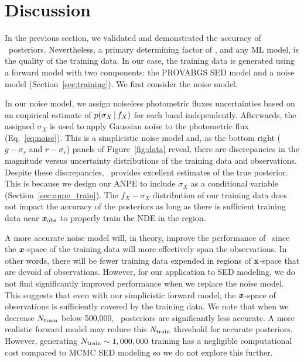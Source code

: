\section{Discussion} \label{sec:discuss}
In the previous section, we validated and demonstrated the accuracy of
\sedflow~posteriors. 
Nevertheless, a primary determining factor of \sedflow, and any ML model, is
the quality of the training data.
In our case, the training data is generated using a forward model with two
components: the PROVABGS SED model and a noise model
(Section~\ref{sec:training}).
We first consider the noise model. 

In our noise model, we assign noiseless photometric fluxes uncertainties based
on an empirical estimate of $p(\sigma_X\,|\, f_X)$ for each band
independently. 
Afterwards, the assigned $\sigma_X$ is used to apply Gaussian noise to the
photometric flux (Eq.~\ref{eq:noise}). 
This is a simplicistic noise model and, as the bottom right ($g - \sigma_r$ and
$r - \sigma_r$) panels of Figure~\ref{fig:data} reveal, there are discrepancies
in the magnitude versus uncertainty distributions of the training data and
observations. 
Despite these discrepancies, \sedflow~provides excellent estimates of the true
posterior.  
This is because we design our ANPE to include $\sigma_X$ as a conditional
variable (Section~\ref{sec:anpe_train}).
The $f_X-\sigma_X$ distribution of our training data does not impact the
accuracy of the posteriors as long as there is sufficient training data near
$\textbf{\textit{x}}_{\rm obs}$ to properly train the NDE in the region.

A more accurate noise model will, in theory, improve the performance of
\sedflow~since the $\textbf{\textit{x}}$-space of the training data will more effectively
span the observations. 
In other words, there will be fewer training data expended in regions of 
${\bf x}$-space that are devoid of observations.  
However, for our application to SED modeling, we do not find significantly  
improved performance when we replace the noise model.
This suggests that even with our simplicistic forward model, the
$\textbf{\textit{x}}$-space of observations is sufficiently covered by the training data. 
We note that when we decrease $N_{\rm train}$ below 500,000,
\sedflow~posteriors are significantly less accurate. 
A more realistic forward model may reduce this $N_{\rm train}$ threshold for
accurate posteriors. 
However, generating $N_{\rm train} \sim 1,000,000$ training has a negligible
computational cost compared to MCMC SED modeling so we do not explore this
further. 

